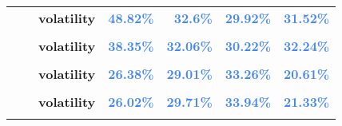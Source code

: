 \documentclass[
  authoryear,
  preprint,
  3p]{elsarticle}
\begin{document}
\begin{longtable}[t]{>{}l>{}l>{}l>{}r>{}r>{}r>{}r}
\textbf{} & \textbf{} & \textbf{volatility} & \textcolor[HTML]{4285f4}{\textbf{48.82\%}} & \textcolor[HTML]{4285f4}{\textbf{32.6\%}} & \textcolor[HTML]{4285f4}{\textbf{29.92\%}} & \textcolor[HTML]{4285f4}{\textbf{31.52\%}}\\
\textbf{\cellcolor{gray!10}{}} & \textbf{\cellcolor{gray!10}{contango}} & \textbf{\cellcolor{gray!10}{mean}} & \textcolor[HTML]{4285f4}{\textbf{\cellcolor{gray!10}{-16.87\%}}} & \textcolor[HTML]{4285f4}{\textbf{\cellcolor{gray!10}{14.38\%}}} & \textcolor[HTML]{4285f4}{\textbf{\cellcolor{gray!10}{3.4\%}}} & \textcolor[HTML]{4285f4}{\textbf{\cellcolor{gray!10}{-10.24\%}}}\\
\addlinespace
\textbf{} & \textbf{} & \textbf{volatility} & \textcolor[HTML]{4285f4}{\textbf{38.35\%}} & \textcolor[HTML]{4285f4}{\textbf{32.06\%}} & \textcolor[HTML]{4285f4}{\textbf{30.22\%}} & \textcolor[HTML]{4285f4}{\textbf{32.24\%}}\\
\textbf{\cellcolor{gray!10}{Cotton-\#2 (IFUS)}} & \textbf{\cellcolor{gray!10}{whole period}} & \textbf{\cellcolor{gray!10}{mean}} & \textcolor[HTML]{4285f4}{\textbf{\cellcolor{gray!10}{3.24\%}}} & \textcolor[HTML]{4285f4}{\textbf{\cellcolor{gray!10}{0.95\%}}} & \textcolor[HTML]{4285f4}{\textbf{\cellcolor{gray!10}{12.53\%}}} & \textcolor[HTML]{4285f4}{\textbf{\cellcolor{gray!10}{0.5\%}}}\\
\textbf{} & \textbf{} & \textbf{volatility} & \textcolor[HTML]{4285f4}{\textbf{26.38\%}} & \textcolor[HTML]{4285f4}{\textbf{29.01\%}} & \textcolor[HTML]{4285f4}{\textbf{33.26\%}} & \textcolor[HTML]{4285f4}{\textbf{20.61\%}}\\
\textbf{\cellcolor{gray!10}{}} & \textbf{\cellcolor{gray!10}{backwardation}} & \textbf{\cellcolor{gray!10}{mean}} & \textcolor[HTML]{4285f4}{\textbf{\cellcolor{gray!10}{22.64\%}}} & \textcolor[HTML]{4285f4}{\textbf{\cellcolor{gray!10}{7.85\%}}} & \textcolor[HTML]{4285f4}{\textbf{\cellcolor{gray!10}{35.53\%}}} & \textcolor[HTML]{4285f4}{\textbf{\cellcolor{gray!10}{10.84\%}}}\\
\textbf{} & \textbf{} & \textbf{volatility} & \textcolor[HTML]{4285f4}{\textbf{26.02\%}} & \textcolor[HTML]{4285f4}{\textbf{29.71\%}} & \textcolor[HTML]{4285f4}{\textbf{33.94\%}} & \textcolor[HTML]{4285f4}{\textbf{21.33\%}}\\
\addlinespace
\textbf{\cellcolor{gray!10}{}} & \textbf{\cellcolor{gray!10}{contango}} & \textbf{\cellcolor{gray!10}{mean}} & \textcolor[HTML]{4285f4}{\textbf{\cellcolor{gray!10}{-16.46\%}}} & \textcolor[HTML]{4285f4}{\textbf{\cellcolor{gray!10}{-5.92\%}}} & \textcolor[HTML]{4285f4}{\textbf{\cellcolor{gray!10}{-9.36\%}}} & \textcolor[HTML]{4285f4}{\textbf{\cellcolor{gray!10}{-8.91\%}}}\\

\end{longtable}
\end{document}
